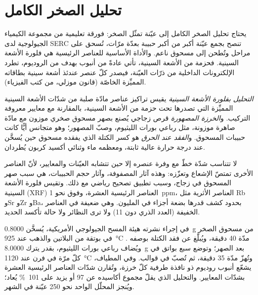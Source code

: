 
\section{تحليل الصخر الكامل}\label{sec:b2:field-lab-methods-2:whole-rock}

يحتاج تحليل الصخر الكامل إلى عيّنة تمثّل الصخر: فورقة تعليمية من مجموعة الكيمياء الجيولوجية
لدى SERC تنصح بجمع عيّنة أكبر من أكبر حبيبة بعدّة مرّات،
تُسحق على مراحل وتُطحن إلى مسحوق ناعم. والأداة الأساسية للعناصر الرئيسية هي
فلورة الأشعة السينية. فحزمة من الأشعة السينية، تأتي عادةً من أنبوب بهدف من الروديوم، تطرد الإلكترونات
الداخلية من ذرّات العيّنة، فيصدر كلّ عنصر عندئذ أشعة سينية بطاقاته
المميِّزة الخاصّة (قانون موزلي، من كتب الفيزياء).

\begin{definition}\label{def:b2:field-lab-methods-2:xrf}
\emph{التحليل بفلورة الأشعة السينية} يقيس تراكيز
عناصر مادّة صلبة من شدّات الأشعة السينية المميِّزة التي تصدرها تحت حزمة من
الأشعة السينية، بالمقارنة مع معايير معروفة التركيب. و\emph{الخرزة
المصهورة} قرص زجاجي يُصنع بصهر مسحوق صخري موزون مع مادّة صاهرة موزونة،
مثل رباعي بورات الليثيوم، وصبّ المصهور؛ وهو متجانس أيًّا كانت حبيبات
المسحوق. و\emph{الفقد عند الحرق} هو كسر الكتلة الذي
يفقده مسحوق حين يُسخَّن عند درجة حرارة عالية ثابتة، ومعظمه ماء وثنائي أكسيد كربون يُطردان.
\end{definition}

لا تتناسب شدّة خطّ مع وفرة عنصره إلا حين تتشابه العيّنات
والمعايير، لأنّ العناصر الأخرى تمتصّ الإشعاع وتعزّزه: وهذه آثار المصفوفة،
وآثار حجم الحبيبات، هي سبب صهر المسحوق في زجاج، وسبب تطبيق تصحيح
رياضي مع ذلك. وتقيس فلورة الأشعة السينية (XRF) العناصر الرئيسية العشرة، وفوق نحو \qty{1}{ppm}،
العناصر الأثرية مثل Rb وSr وZr وBa، بحدود كشف قدرها بضعة أجزاء في المليون. وهي
ضعيفة في العناصر الخفيفة (العدد الذري دون 11) ولا ترى النظائر ولا حالة
تأكسد الحديد.

\begin{inthelab}
في إجراء نشرته هيئة المسح الجيولوجي الأمريكية، يُسخَّن \qty{0.8000}{g} من مسحوق الصخر في
بوتقة من البلاتين والذهب عند \qty{925}{\celsius} مدّة 40 دقيقة، ويُبلَّغ عن فقد الكتلة بوصفه
. ويُضاف رباعي بورات الليثيوم، بقدر يترك \qty{8.0000}{g} بعد الصهر؛
وتوضع سبع بواتق في كلّ مرّة في فرن عند \qty{1120}{\celsius} وتُهزّ مدّة 35 دقيقة،
ثم تُصبّ في قوالب. وفي المطياف، يشعّع أنبوب روديوم ذو نافذة طرفية كلّ خرزة، وتُقارن
شدّات العناصر الرئيسية العشرة بشدّات المعايير. والتحليل الذي يقلّ مجموع
أكاسيده عن 97 أو يزيد على \qty{101}{\percent} يُعاد؛ ويُنجز المحلّل الواحد
نحو 250 عيّنة في الشهر.
\end{inthelab}

